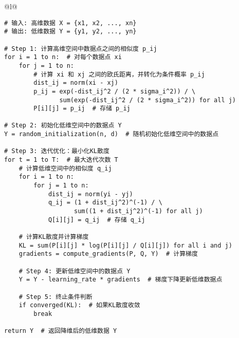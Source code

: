 \documentclass[master]{thesis-uestc}
\begin{document}
\begin{table}[h]
    \caption{t-SNE算法伪代码}
    \begin{tabular}{@{}l@{}} %
    \toprule
     \\ %
    \midrule
    \begin{lstlisting}[basicstyle=\ttfamily,frame=none]
# 输入: 高维数据 X = {x1, x2, ..., xn}
# 输出: 低维数据 Y = {y1, y2, ..., yn}

# Step 1: 计算高维空间中数据点之间的相似度 p_ij
for i = 1 to n:  # 对每个数据点 xi
    for j = 1 to n:
        # 计算 xi 和 xj 之间的欧氏距离，并转化为条件概率 p_ij
        dist_ij = norm(xi - xj)
        p_ij = exp(-dist_ij^2 / (2 * sigma_i^2)) / \
               sum(exp(-dist_ij^2 / (2 * sigma_i^2)) for all j)
        P[i][j] = p_ij  # 存储 p_ij
    
# Step 2: 初始化低维空间中的数据点 Y
Y = random_initialization(n, d)  # 随机初始化低维空间中的数据点

# Step 3: 迭代优化：最小化KL散度
for t = 1 to T:  # 最大迭代次数 T
    # 计算低维空间中的相似度 q_ij
    for i = 1 to n:
        for j = 1 to n:
            dist_ij = norm(yi - yj)
            q_ij = (1 + dist_ij^2)^(-1) / \
                   sum((1 + dist_ij^2)^(-1) for all j)
            Q[i][j] = q_ij  # 存储 q_ij

    # 计算KL散度并计算梯度
    KL = sum(P[i][j] * log(P[i][j] / Q[i][j]) for all i and j)
    gradients = compute_gradients(P, Q, Y)  # 计算梯度
    
    # Step 4: 更新低维空间中的数据点 Y
    Y = Y - learning_rate * gradients  # 梯度下降更新低维数据点

    # Step 5: 终止条件判断
    if converged(KL):  # 如果KL散度收敛
        break

return Y  # 返回降维后的低维数据 Y
    \end{lstlisting} \\
    \bottomrule
    \end{tabular}
    \label{table:tsne_code}
\end{table}
\end{document}

